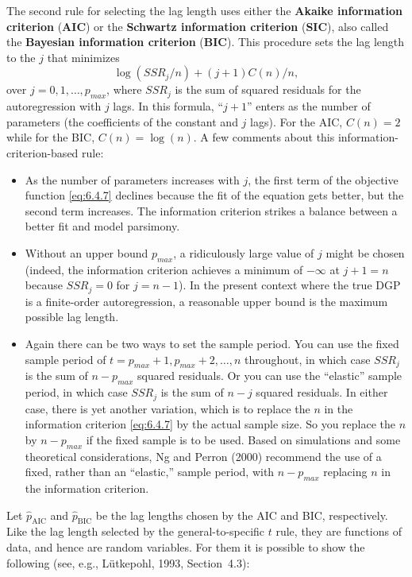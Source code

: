 The second rule for selecting the lag length uses either the \textbf{Akaike information
criterion} (\textbf{AIC}) or the \textbf{Schwartz information criterion} (\textbf{SIC}), also called the
\textbf{Bayesian information criterion} (\textbf{BIC}). This procedure sets the lag length to the $j$
that minimizes
\begin{equation}
  \log(SSR_j / n) + (j + 1) C(n) / n,
  \label{eq:6.4.7}
\end{equation}
over $j = 0, 1, \ldots, p_{max}$, where $SSR_j$ is the sum of squared residuals for the autoregression
with $j$ lags. In this formula, ``$j + 1$'' enters as the number of parameters
(the coefficients of the constant and $j$ lags). For the AIC, $C(n) = 2$ while for the
BIC, $C(n) = \log(n)$. A few comments about this information-criterion-based rule:
\begin{itemize}
\item As the number of parameters increases with $j$, the first term of the objective
function \eqref{eq:6.4.7} declines because the fit of the equation gets better, but the second
term increases. The information criterion strikes a balance between a better
fit and model parsimony.

\item Without an upper bound $p_{max}$, a ridiculously large value of $j$ might be chosen
(indeed, the information criterion achieves a minimum of $-\infty$ at $j + 1 = n$
because $SSR_j = 0$ for $j = n - 1$). In the present context where the true DGP is a
finite-order autoregression, a reasonable upper bound is the maximum possible
lag length.

\item Again there can be two ways to set the sample period. You can use the fixed
sample period of $t = p_{max} + 1, p_{max} + 2, \ldots, n$ throughout, in which case $SSR_j$
is the sum of $n - p_{max}$ squared residuals. Or you can use the ``elastic'' sample
period, in which case $SSR_j$ is the sum of $n - j$ squared residuals. In either case,
there is yet another variation, which is to replace the $n$ in the information criterion
\eqref{eq:6.4.7} by the actual sample size. So you replace the $n$ by $n - p_{max}$ if
the fixed sample is to be used. Based on simulations and some theoretical considerations,
Ng and Perron (2000) recommend the use of a fixed, rather than an
``elastic,'' sample period, with $n - p_{max}$ replacing $n$ in the information criterion.
\end{itemize}

Let $\hat{p}_{\text{AIC}}$ and $\hat{p}_{\text{BIC}}$ be the lag lengths chosen by the AIC and BIC, respectively.
Like the lag length selected by the general-to-specific $t$ rule, they are functions of
data, and hence are random variables. For them it is possible to show the following
(see, e.g., L\"utkepohl, 1993, Section~4.3):

